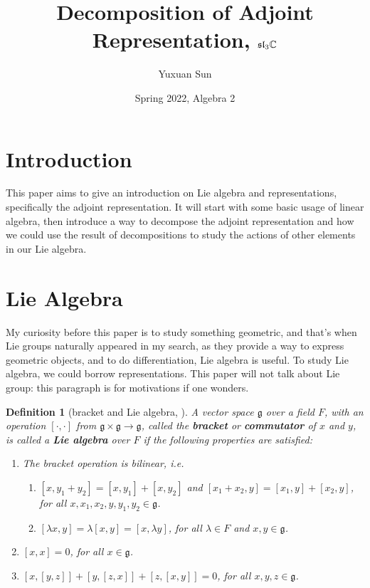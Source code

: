 \documentclass[a4paper]{article}
\title{Decomposition of Adjoint Representation, $\mathfrak{sl}_3\mathbb{C}$}
\date{Spring 2022, Algebra 2}
\author{Yuxuan Sun}
\theoremstyle{bfnote} %
\theoremstyle{bfnote}                  %
\newtheorem{defn}[thm]{Definition}
\theoremstyle{example}                       %
\theoremstyle{remark}                       %
\numberwithin{equation}{section}
\begin{document}
\maketitle
\tableofcontents

\section{Introduction}
This paper aims to give an introduction on Lie algebra and representations, specifically the adjoint representation. It will start with some basic usage of linear algebra, then introduce a way to decompose the adjoint representation and how we could use the result of decompositions to study the actions of other elements in our Lie algebra.

\section{Lie Algebra}
My curiosity before this paper is to study something geometric, and that's when Lie groups naturally appeared in my search, as they provide a way to express geometric objects, and to do differentiation, Lie algebra is useful. To study Lie algebra, we could borrow representations. This paper will not talk about Lie group: this paragraph is for motivations if one wonders.

\begin{defn}[bracket and Lie algebra, \cite{humph}]\label{bracket}
	A vector space $\mathfrak{g}$ over a field $F$, with an operation $\left[ \cdot, \cdot \right] $ from $\mathfrak{g} \times \mathfrak{g} \to  \mathfrak{g}$, called the  \textbf{bracket} or \textbf{commutator} of $x$ and  $y$, is called a  \textbf{Lie algebra} over $F$ if the following properties are satisfied:
\begin{enumerate}
		 \item The bracket operation is bilinear, i.e.
\begin{enumerate}
	\item $[x,y_1+y_2] = [x,y_1] + [x,y_2]$ and $[x_1+x_2,y] = [x_1,y] + [x_2,y]$, for all $x, x_1, x_2, y, y_1,y_2 \in \mathfrak{g}$.
	\item $[\lambda x, y] = \lambda[x,y] = [x, \lambda y]$, for all $\lambda \in F$ and $x, y \in \mathfrak{g}$.
\end{enumerate}
		 \item $[x,x] = 0$, for all $x \in \mathfrak{g}$.
		 \item $[x,[y,z]]+[y,[z,x]] +[z,[x,y]] = 0$, for all $x,y,z \in \mathfrak{g}$.
	\end{enumerate}
\end{defn}
\end{document}
